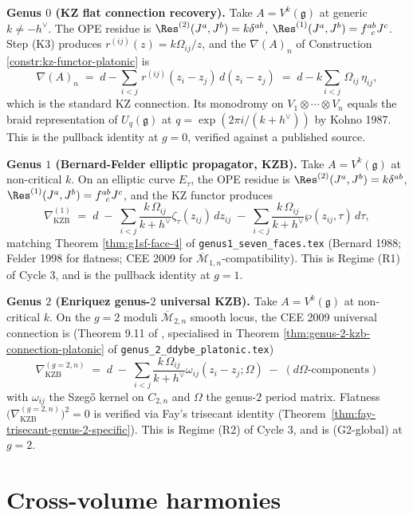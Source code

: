 \documentclass[12pt]{article}
\providecommand{\KZB}{\mathrm{KZB}}
\providecommand{\Mbar}{\overline{\mathcal{M}}}
\providecommand{\fg}{\mathfrak{g}}
\providecommand{\hv}{h^{\vee}}
\theoremstyle{definition}
\begin{document}
\textbf{Genus $0$ (KZ flat connection recovery).}
Take $A = V^{k}(\fg)$ at generic $k \neq -\hv$.
The OPE residue is $\Res^{(2)}(J^a, J^b) = k\delta^{ab}$,
$\Res^{(1)}(J^a, J^b) = f^{ab}_{\;\;c}J^c$.
Step (K3) produces $r^{(ij)}(z) = k\Omega_{ij}/z$, and the
$\nabla(A)_n$ of Construction \ref{constr:kz-functor-platonic}
is
\[
   \nabla(A)_n \;=\; d - \sum_{i < j}\,r^{(ij)}(z_i - z_j)\,d(z_i - z_j)
   \;=\; d - k\sum_{i < j}\,\Omega_{ij}\,\eta_{ij},
\]
which is the standard KZ connection.  Its monodromy on
$V_1 \otimes \cdots \otimes V_n$ equals the braid
representation of $U_q(\fg)$ at
$q = \exp(2\pi i/(k + \hv))$ by Kohno 1987.  This is the
pullback identity at $g = 0$, verified against a published
source.

\textbf{Genus $1$ (Bernard-Felder elliptic propagator, KZB).}
Take $A = V^{k}(\fg)$ at non-critical $k$.
On an elliptic curve $E_\tau$, the OPE residue is
$\Res^{(2)}(J^a, J^b) = k\delta^{ab}$,
$\Res^{(1)}(J^a, J^b) = f^{ab}_{\;\;c}J^c$, and the KZ functor
produces
\[
   \nabla_{\KZB}^{(1)}
   \;=\; d \;-\; \sum_{i < j}\frac{k\,\Omega_{ij}}{k + \hv}\zeta_\tau(z_{ij})\,dz_{ij}
             \;-\; \sum_{i < j}\frac{k\,\Omega_{ij}}{k + \hv}\wp(z_{ij},\tau)\,d\tau,
\]
matching Theorem \ref{thm:g1sf-face-4} of
\texttt{genus1\_seven\_faces.tex} (Bernard 1988; Felder 1998
for flatness; CEE 2009 for $\Mbar_{1,n}$-compatibility).
This is Regime (R1) of Cycle 3, and is the pullback identity
at $g = 1$.

\textbf{Genus $2$ (Enriquez genus-$2$ universal KZB).}
Take $A = V^{k}(\fg)$ at non-critical $k$.
On the $g = 2$ moduli $\Mbar_{2,n}$ smooth locus, the CEE 2009
universal connection is (Theorem 9.11 of \cite{CEE09},
specialised in Theorem \ref{thm:genus-2-kzb-connection-platonic}
of \texttt{genus\_2\_ddybe\_platonic.tex})
\[
   \nabla_{\KZB}^{(g=2,n)}
   \;=\; d \;-\; \sum_{i < j}\frac{k\,\Omega_{ij}}{k + \hv}\omega_{ij}(z_i - z_j; \Omega)
             \;-\; (\text{$d\Omega$-components})
\]
with $\omega_{ij}$ the Szeg\H{o} kernel on $C_{2,n}$ and
$\Omega$ the genus-$2$ period matrix.  Flatness
$\bigl(\nabla_{\KZB}^{(g=2,n)}\bigr)^{2} = 0$ is verified via
Fay's trisecant identity
(Theorem~\ref{thm:fay-trisecant-genus-2-specific}).
This is Regime (R2) of Cycle 3, and is (G2-global) at $g = 2$.

\section{Cross-volume harmonies}
\label{sec:G2-harmonies}
\end{document}
